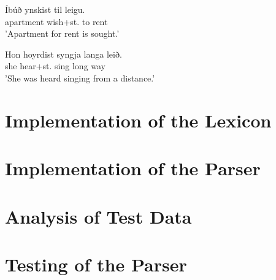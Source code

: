 \documentclass[12pt,%
]{lin-v2/lin}
\begin{document}
\begin{exe}
    \ex
    \begin{xlist}
        \item \gll Íbúð ynskist til leigu.\\
        apartment wish+st.\Prs{} to rent\\
        \trans 'Apartment for rent is sought.'\\
        \item \gll Hon hoyrdist syngja langa leið.\\
        she {hear}+st.\Pst{} sing long way\\
        \trans 'She was heard singing from a distance.'
    \end{xlist}
\end{exe}



\section{Implementation of the Lexicon}

\section{Implementation of the Parser}

\section{Analysis of Test Data}

\section{Testing of the Parser}


    

\end{document}
